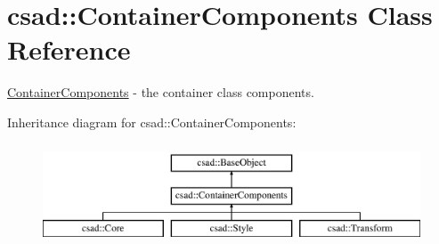 \hypertarget{classcsad_1_1_container_components}{\section{csad\-:\-:Container\-Components Class Reference}
\label{classcsad_1_1_container_components}
}


\hyperlink{classcsad_1_1_container_components}{Container\-Components} -\/ the container class components.  


Inheritance diagram for csad\-:\-:Container\-Components\-:\begin{figure}[H]
\begin{center}
\leavevmode
\includegraphics[height=3.000000cm]{classcsad_1_1_container_components}
\end{center}
\end{figure}
